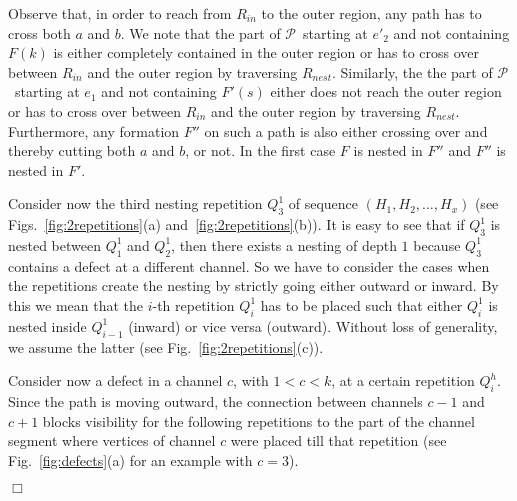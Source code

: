 \documentclass[a4paper,10pt]{llncs}
\renewenvironment{proof}
{{\bf Proof:}}{\hspace*{\fill}$\Box$\par\vspace{2mm}}
\renewcommand{\P}{\mbox{$\mathcal P$ }}
\begin{document}
\begin{proof}
Observe that, in order to reach from $R_{in}$ to the outer region, any path has to cross both $a$ and $b$.
We note that the part of \P starting at $e'_2$ and not containing $F(k)$ is either completely contained in the outer region or has to cross over between $R_{in}$ and the outer region by traversing $R_{nest}$. Similarly, the
the part of \P starting at $e_1$ and not containing $F'(s)$ either does not reach the outer region or has to cross over between $R_{in}$ and the outer region by traversing $R_{nest}$. Furthermore, any formation $F''$ on such a path is also either crossing over and thereby cutting both $a$ and $b$, or not. In the first case $F$ is nested in $F''$ and $F''$ is nested in $F'$.

Consider now the third nesting repetition $Q^1_3$ of sequence $(H_1,H_2,\ldots,H_x)$ (see Figs.~\ref{fig:2repetitions}(a) and~\ref{fig:2repetitions}(b)).
It is easy to see that if $Q^1_3$ is nested between $Q^1_1$ and $Q^1_2$, then there exists a nesting of depth $1$ because $Q^1_3$ contains a defect at a different channel. So we have to consider the cases when the repetitions create the nesting by strictly going either outward or inward. By this we mean that the $i$-th repetition $Q^1_i$ has to be placed such that either $Q^1_i$ is nested inside $Q^1_{i-1}$ (inward) or vice versa (outward).
Without loss of generality, we assume the latter (see Fig.~\ref{fig:2repetitions}(c)).

Consider now a defect in a channel $c$, with $1 < c < k$, at a certain repetition $Q^h_i$. Since the path is moving outward, the connection between channels $c-1$ and $c+1$ blocks visibility for the following repetitions to the part of the channel segment where vertices of channel $c$ were placed till that repetition (see Fig.~\ref{fig:defects}(a) for an example with $c=3$).


\end{proof}
\end{document}
